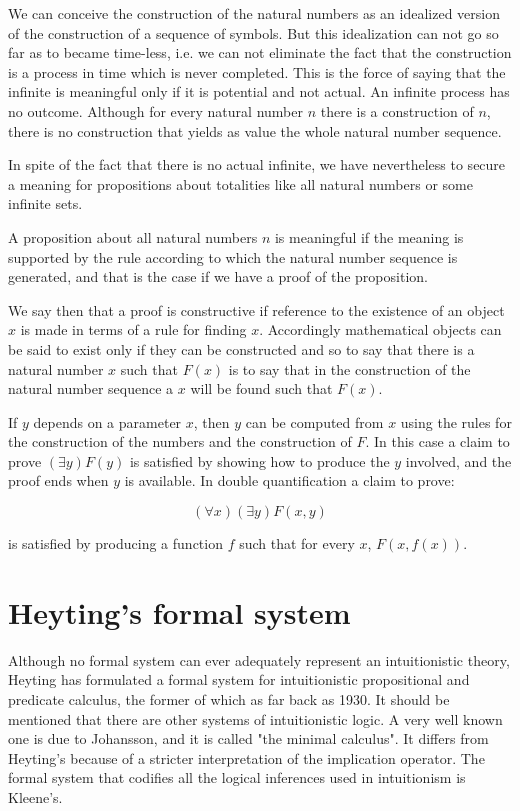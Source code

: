\documentclass[12pt]{article}
\begin{document}
We can conceive the construction of the natural numbers as an idealized version of the construction of a sequence of symbols. But this idealization can not go so far as to became time-less, i.e. we can not eliminate the fact that the construction is a process in time which is never completed. This is the force of saying that the infinite is meaningful only if it is potential and not actual. An infinite process has no outcome. Although for every natural number $n$ there is a construction of $n$, there is no construction that yields as value the whole natural number sequence.

In spite of the fact that there is no actual infinite, we have nevertheless to secure a meaning for propositions about totalities like all natural numbers or some infinite sets.

A proposition about all natural numbers $n$ is meaningful if the meaning is supported by the rule according to which the natural number sequence is generated, and that is the case if we have a proof of the proposition.
 
We say then that a proof is constructive if reference to the existence of an object $x$ is made in terms of a rule for finding $x$. Accordingly mathematical objects can be said to exist only if they can be constructed and so to say that there is a natural number $x$ such that $F (x)$ is to say that in the construction of the natural number sequence a $x$ will be found such that $F (x)$.

If $y$ depends on a parameter $x$, then $y$ can be computed from $x$ using the rules for the construction of the numbers and the construction of $F$. In this case a claim to prove $(\exists y) F (y)$ is satisfied by showing how to produce the $y$ involved, and the proof ends when $y$ is available. In double quantification a claim to prove:

$$(\forall x) (\exists y) F (x, y)$$

is satisfied by producing a function $f$ such that for every $x$, $F (x, f (x))$.

\section{Heyting's formal system}\normalsize

Although no formal system can ever adequately represent an intuitionistic theory, Heyting has formulated a formal system for intuitionistic propositional and predicate calculus, the former of which as far back as 1930. It should be mentioned that there are other systems of intuitionistic logic. A very well known one is due to Johansson, and it is called "the minimal calculus". It differs from Heyting's because of a stricter interpretation of the implication operator. The formal system that codifies all the logical inferences used in intuitionism is Kleene's.
\end{document}
